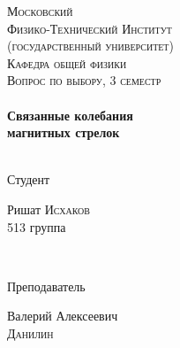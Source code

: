 \begin{titlepage}
\center %
 

\textsc{\LARGE Московский\\[-0.2cm]Физико-Технический Институт\\[0.1cm]\large (государственный университет)}\\[1.5cm] %
\textsc{\Large Кафедра общей физики}\\[0.1cm] %
\textsc{\large Вопрос по выбору, 3 семестр}\\[0.5cm] %


\HRule
\\[0.4cm]
{ \huge \bfseries Связанные колебания\\[0.2cm]
магнитных стрелок}
\\[0.6cm] %
\HRule
\\[1.5cm]


 

\begin{minipage}{0.4\textwidth}
	\begin{flushleft} \large
		\textsf{Студент}
		
		Ришат \textsc{Исхаков} \\[-0.15cm]
		513 группа
	\end{flushleft}
\end{minipage}
~
\begin{minipage}{0.4\textwidth}
	\begin{flushright} \large
		\textsf{Преподаватель}
		
		Валерий Алексеевич \\[-0.15cm]
		\textsc{Данилин} %
	\end{flushright}
\end{minipage}


\end{titlepage}
